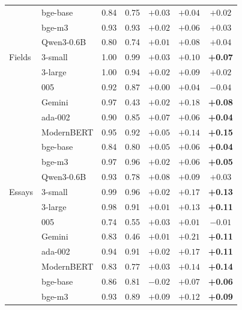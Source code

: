 \begin{table}[h]
\begin{tabular}{llccccc}
 & bge-base & 0.84 & 0.75 & $+0.03$ & $+0.04$ & $+0.02$ \\
 & bge-m3 & 0.93 & 0.93 & $+0.02$ & $+0.06$ & $+0.03$ \\
 & Qwen3-0.6B & 0.80 & 0.74 & $+0.01$ & $+0.08$ & $+0.04$ \\
\midrule
Fields & 3-small & 1.00 & 0.99 & $+0.03$ & $+0.10$ & \textbf{+0.07}\rlap{\,\textcolor[HTML]{D55E00}{$\bullet$}} \\
 & 3-large & 1.00 & 0.94 & $+0.02$ & $+0.09$ & $+0.02$ \\
 & 005 & 0.92 & 0.87 & $+0.00$ & $+0.04$ & $-0.04$ \\
 & Gemini & 0.97 & 0.43 & $+0.02$ & $+0.18$ & \textbf{+0.08}\rlap{\,\textcolor[HTML]{D55E00}{$\bullet$}} \\
 & ada-002 & 0.90 & 0.85 & $+0.07$ & $+0.06$ & \textbf{+0.04}\rlap{\,\textcolor[HTML]{D55E00}{$\bullet$}} \\
 & ModernBERT & 0.95 & 0.92 & $+0.05$ & $+0.14$ & \textbf{+0.15}\rlap{\,\textcolor[HTML]{D55E00}{$\bullet$}} \\
 & bge-base & 0.84 & 0.80 & $+0.05$ & $+0.06$ & \textbf{+0.04}\rlap{\,\textcolor[HTML]{D55E00}{$\bullet$}} \\
 & bge-m3 & 0.97 & 0.96 & $+0.02$ & $+0.06$ & \textbf{+0.05}\rlap{\,\textcolor[HTML]{D55E00}{$\bullet$}} \\
 & Qwen3-0.6B & 0.93 & 0.78 & $+0.08$ & $+0.09$ & $+0.03$ \\
\midrule
Essays & 3-small & 0.99 & 0.96 & $+0.02$ & $+0.17$ & \textbf{+0.13}\rlap{\,\textcolor[HTML]{D55E00}{$\bullet$}} \\
 & 3-large & 0.98 & 0.91 & $+0.01$ & $+0.13$ & \textbf{+0.11}\rlap{\,\textcolor[HTML]{D55E00}{$\bullet$}} \\
 & 005 & 0.74 & 0.55 & $+0.03$ & $+0.01$ & $-0.01$ \\
 & Gemini & 0.83 & 0.46 & $+0.01$ & $+0.21$ & \textbf{+0.11}\rlap{\,\textcolor[HTML]{D55E00}{$\bullet$}} \\
 & ada-002 & 0.94 & 0.91 & $+0.02$ & $+0.17$ & \textbf{+0.11}\rlap{\,\textcolor[HTML]{D55E00}{$\bullet$}} \\
 & ModernBERT & 0.83 & 0.77 & $+0.03$ & $+0.14$ & \textbf{+0.14}\rlap{\,\textcolor[HTML]{D55E00}{$\bullet$}} \\
 & bge-base & 0.86 & 0.81 & $-0.02$ & $+0.07$ & \textbf{+0.06}\rlap{\,\textcolor[HTML]{D55E00}{$\bullet$}} \\
 & bge-m3 & 0.93 & 0.89 & $+0.09$ & $+0.12$ & \textbf{+0.09}\rlap{\,\textcolor[HTML]{D55E00}{$\bullet$}} \\

\end{tabular}
\end{table}
